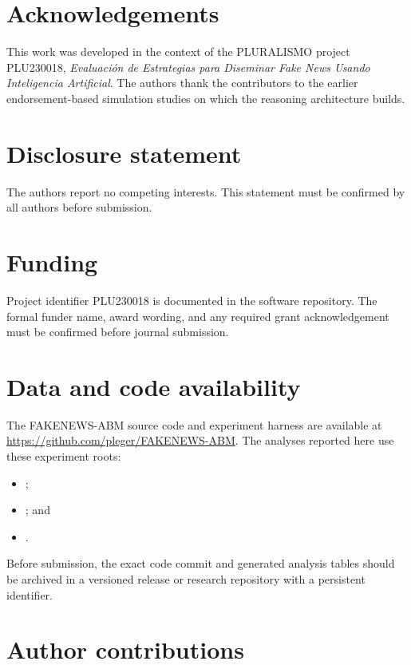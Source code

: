 \section*{Acknowledgements}

This work was developed in the context of the PLURALISMO project PLU230018, \emph{Evaluación de Estrategias para Diseminar Fake News Usando Inteligencia Artificial}. The authors thank the contributors to the earlier endorsement-based simulation studies on which the reasoning architecture builds.

\section*{Disclosure statement}

The authors report no competing interests. This statement must be confirmed by all authors before submission.

\section*{Funding}

Project identifier PLU230018 is documented in the software repository. The formal funder name, award wording, and any required grant acknowledgement must be confirmed before journal submission.

\section*{Data and code availability}

The FAKENEWS-ABM source code and experiment harness are available at \url{https://github.com/pleger/FAKENEWS-ABM}. The analyses reported here use these experiment roots:
\begin{itemize}
  \item {};
  \item {}; and
  \item {}.
\end{itemize}
Before submission, the exact code commit and generated analysis tables should be archived in a versioned release or research repository with a persistent identifier.

\section*{Author contributions}

